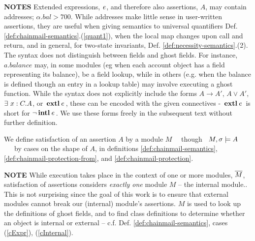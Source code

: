 \noindent
\textbf{NOTES}  \notesep Extended expressions, $\mathit{e}$, and therefore also assertions, $A$, may contain addresses; \eg   $\alpha.bal > 700$. 
{While addresses make little sense in user-written assertions, they are useful when giving semantics to universal quantifiers 
\cf Def. \ref{def:chainmail-semantics}.(\ref{quant1}), {when the local map changes \eg upon call and return, and in general,} for two-state invariants, \cf Def. \ref{def:necessity-semantics}.(2).}
\notesep The syntax does  not distinguish between fields and ghost fields. For instance, $a.balance$ may, in some modules (eg when each account object has a field representing its balance), be a field lookup, while in others (e.g. when the balance is defined though an entry in a lookup table) may involve executing a ghost function. 
\notesep While the syntax does not explicitly include the forms $A\rightarrow A'$, $A \vee A'$, ${\exists\ x:C.A}$, or ${\, \mathbf{extl}\, \mathit{e}\, }$, these can be encoded with the given connectives -  ${\, \mathbf{extl}\, \mathit{e}\, }$ is short for $\neg {\ensuremath{\, \mathbf{intl}}\, \mathit{e}\, }$. We use these forms freely in the subsequent text without further definition.






\begin{definition} 
\label{def:chainmail-semantics-all}
\label{def:chainmail-semantics}
We define satisfaction of an assertion $A$ by a %
 module $M$ \ \  though \ $M , \sigma \models {A}$ \ \ \ by cases on the shape of $A$, in definitions \ref{def:chainmail-semantics}, \ref{def:chainmail-protection-from}, and 
 \ref{def:chainmail-protection}.
\end{definition}

\noindent
\textbf{NOTE}  While execution takes place in the context of one or more modules, $\overline{M}$, satisfaction of assertions considers \emph{exactly one} module  $M$ -- the internal module..
{This is not surprising since the goal of this work is to ensure that external modules cannot break our (internal) module's assertions.}
$M$ is used %
 to look up the definitions of ghost fields, and to find class definitions to determine whether an object is internal or external
-- c.f. Def. \ref{def:chainmail-semantics}, cases (\ref{cExpr}),  (\ref{cInternal}). %

